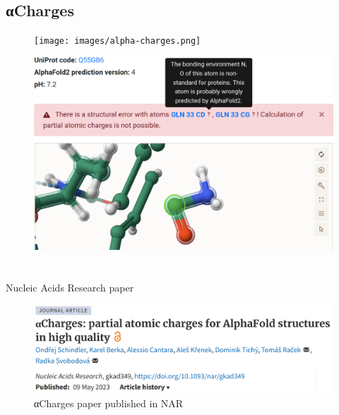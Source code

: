 \documentclass[
]{beamer}
\begin{document}
\subsection[αCharges]{αCharges}

\begin{frame}
  \begin{figure}
    \texttt{[image: images/alpha-charges.png]}
  \end{figure}
  \end{frame}

\begin{frame}
  \begin{figure}
    \includegraphics[width=1\textwidth,height=\textheight,keepaspectratio]{images/focus.png}
  \end{figure}
  \end{frame}

\section[]{}

\begin{frame}{Nucleic Acids Research paper}
\begin{figure}
  \includegraphics[width=1\textwidth,keepaspectratio]{images/paper.png}
  \caption{αCharges paper published in NAR \cite{schindler2023acharges}}
\end{figure}
\end{frame}
\end{document}
